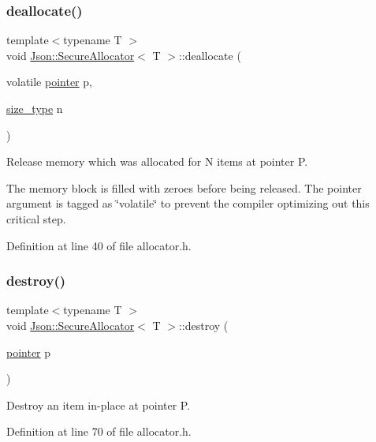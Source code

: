 \subsubsection{\texorpdfstring{deallocate()}{deallocate()}}
{\footnotesize\ttfamily template$<$typename T $>$ \\
void \hyperlink{class_json_1_1_secure_allocator}{Json\+::\+Secure\+Allocator}$<$ T $>$\+::deallocate (\begin{DoxyParamCaption}\item[{volatile \hyperlink{class_json_1_1_secure_allocator_a442c09b3267622d23416d9072ea1afe9}{pointer}}]{p,  }\item[{\hyperlink{class_json_1_1_secure_allocator_a61c258f0ae80af6982fae200b55a4dc9}{size\+\_\+type}}]{n }\end{DoxyParamCaption})\hspace{0.3cm}{\ttfamily [inline]}}

Release memory which was allocated for N items at pointer P.

The memory block is filled with zeroes before being released. The pointer argument is tagged as \char`\"{}volatile\char`\"{} to prevent the compiler optimizing out this critical step. 

Definition at line 40 of file allocator.\+h.

\hypertarget{class_json_1_1_secure_allocator_a7316f4efeb3b992c69c94e345ac9f5cd}{}\label{class_json_1_1_secure_allocator_a7316f4efeb3b992c69c94e345ac9f5cd} 
\subsubsection{\texorpdfstring{destroy()}{destroy()}}
{\footnotesize\ttfamily template$<$typename T $>$ \\
void \hyperlink{class_json_1_1_secure_allocator}{Json\+::\+Secure\+Allocator}$<$ T $>$\+::destroy (\begin{DoxyParamCaption}\item[{\hyperlink{class_json_1_1_secure_allocator_a442c09b3267622d23416d9072ea1afe9}{pointer}}]{p }\end{DoxyParamCaption})\hspace{0.3cm}{\ttfamily [inline]}}

Destroy an item in-\/place at pointer P. 

Definition at line 70 of file allocator.\+h.

